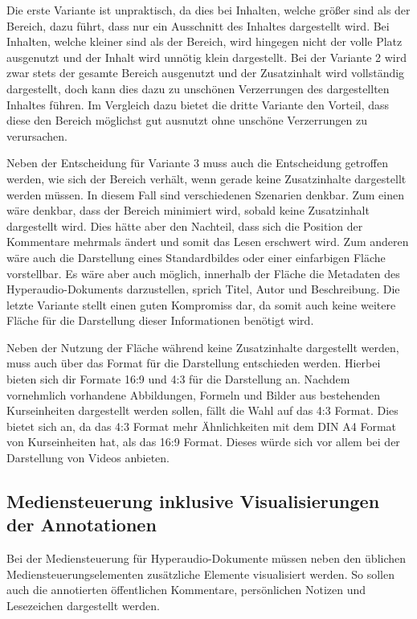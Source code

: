 Die erste Variante ist unpraktisch, da dies bei Inhalten, welche größer sind als der Bereich, dazu führt, dass nur ein Ausschnitt des Inhaltes dargestellt wird. Bei Inhalten, welche kleiner sind als der Bereich, wird hingegen nicht der volle Platz ausgenutzt und der Inhalt wird unnötig klein dargestellt. Bei der Variante 2 wird zwar stets der gesamte Bereich ausgenutzt und der Zusatzinhalt wird vollständig dargestellt, doch kann dies dazu zu unschönen Verzerrungen des dargestellten Inhaltes führen. Im Vergleich dazu bietet die dritte Variante den Vorteil, dass diese den Bereich möglichst gut ausnutzt ohne unschöne Verzerrungen zu verursachen.

Neben der Entscheidung für Variante 3 muss auch die Entscheidung getroffen werden, wie sich der Bereich verhält, wenn gerade keine Zusatzinhalte dargestellt werden müssen. In diesem Fall sind verschiedenen Szenarien denkbar. Zum einen wäre denkbar, dass der Bereich minimiert wird, sobald keine Zusatzinhalt dargestellt wird. Dies hätte aber den Nachteil, dass sich die Position der Kommentare mehrmals ändert und somit das Lesen erschwert wird. Zum anderen wäre auch die Darstellung eines Standardbildes oder einer einfarbigen Fläche vorstellbar. Es wäre aber auch möglich, innerhalb der Fläche die Metadaten des Hyperaudio-Dokuments darzustellen, sprich Titel, Autor und Beschreibung. Die letzte Variante stellt einen guten Kompromiss dar, da somit auch keine weitere Fläche für die Darstellung dieser Informationen benötigt wird.

Neben der Nutzung der Fläche während keine Zusatzinhalte dargestellt werden, muss auch über das Format für die Darstellung entschieden werden. Hierbei bieten sich dir Formate 16:9 und 4:3 für die Darstellung an. Nachdem vornehmlich vorhandene Abbildungen, Formeln und Bilder aus bestehenden Kurseinheiten dargestellt werden sollen, fällt die Wahl auf das 4:3 Format. Dies bietet sich an, da das 4:3 Format mehr Ähnlichkeiten mit dem DIN A4 Format von Kurseinheiten hat, als das 16:9 Format. Dieses würde sich vor allem bei der Darstellung von Videos anbieten.


\subsection{Mediensteuerung inklusive Visualisierungen der Annotationen}
\label{sub:Mediensteuerung}
Bei der Mediensteuerung für Hyperaudio-Dokumente müssen neben den üblichen Mediensteuerungselementen zusätzliche Elemente visualisiert werden. So sollen auch die annotierten öffentlichen Kommentare, persönlichen Notizen und Lesezeichen dargestellt werden.

